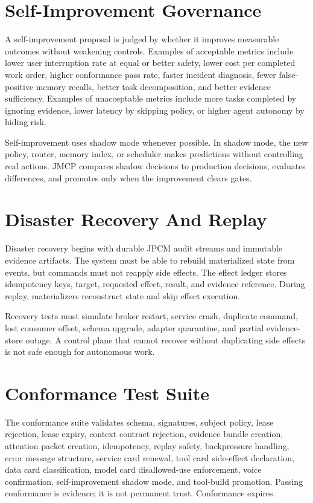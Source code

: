 \documentclass[10pt,journal,onecolumn]{IEEEtran}
\begin{document}
\section{Self-Improvement Governance}
A self-improvement proposal is judged by whether it improves measurable outcomes without weakening controls. Examples of acceptable metrics include lower user interruption rate at equal or better safety, lower cost per completed work order, higher conformance pass rate, faster incident diagnosis, fewer false-positive memory recalls, better task decomposition, and better evidence sufficiency. Examples of unacceptable metrics include more tasks completed by ignoring evidence, lower latency by skipping policy, or higher agent autonomy by hiding risk.

Self-improvement uses shadow mode whenever possible. In shadow mode, the new policy, router, memory index, or scheduler makes predictions without controlling real actions. JMCP compares shadow decisions to production decisions, evaluates differences, and promotes only when the improvement clears gates.

\section{Disaster Recovery And Replay}
Disaster recovery begins with durable JPCM audit streams and immutable evidence artifacts. The system must be able to rebuild materialized state from events, but commands must not reapply side effects. The effect ledger stores idempotency keys, target, requested effect, result, and evidence reference. During replay, materializers reconstruct state and skip effect execution.

Recovery tests must simulate broker restart, service crash, duplicate command, lost consumer offset, schema upgrade, adapter quarantine, and partial evidence-store outage. A control plane that cannot recover without duplicating side effects is not safe enough for autonomous work.

\section{Conformance Test Suite}
The conformance suite validates schema, signatures, subject policy, lease rejection, lease expiry, context contract rejection, evidence bundle creation, attention packet creation, idempotency, replay safety, backpressure handling, error message structure, service card renewal, tool card side-effect declaration, data card classification, model card disallowed-use enforcement, voice confirmation, self-improvement shadow mode, and tool-build promotion. Passing conformance is evidence; it is not permanent trust. Conformance expires.
\end{document}
